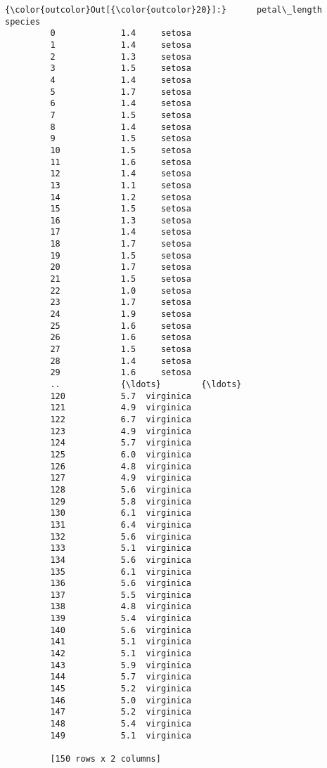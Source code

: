 \documentclass[11pt]{article}
\begin{document}
\begin{Verbatim}[commandchars=\\\{\}]
{\color{outcolor}Out[{\color{outcolor}20}]:}      petal\_length    species
         0             1.4     setosa
         1             1.4     setosa
         2             1.3     setosa
         3             1.5     setosa
         4             1.4     setosa
         5             1.7     setosa
         6             1.4     setosa
         7             1.5     setosa
         8             1.4     setosa
         9             1.5     setosa
         10            1.5     setosa
         11            1.6     setosa
         12            1.4     setosa
         13            1.1     setosa
         14            1.2     setosa
         15            1.5     setosa
         16            1.3     setosa
         17            1.4     setosa
         18            1.7     setosa
         19            1.5     setosa
         20            1.7     setosa
         21            1.5     setosa
         22            1.0     setosa
         23            1.7     setosa
         24            1.9     setosa
         25            1.6     setosa
         26            1.6     setosa
         27            1.5     setosa
         28            1.4     setosa
         29            1.6     setosa
         ..            {\ldots}        {\ldots}
         120           5.7  virginica
         121           4.9  virginica
         122           6.7  virginica
         123           4.9  virginica
         124           5.7  virginica
         125           6.0  virginica
         126           4.8  virginica
         127           4.9  virginica
         128           5.6  virginica
         129           5.8  virginica
         130           6.1  virginica
         131           6.4  virginica
         132           5.6  virginica
         133           5.1  virginica
         134           5.6  virginica
         135           6.1  virginica
         136           5.6  virginica
         137           5.5  virginica
         138           4.8  virginica
         139           5.4  virginica
         140           5.6  virginica
         141           5.1  virginica
         142           5.1  virginica
         143           5.9  virginica
         144           5.7  virginica
         145           5.2  virginica
         146           5.0  virginica
         147           5.2  virginica
         148           5.4  virginica
         149           5.1  virginica
         
         [150 rows x 2 columns]
\end{Verbatim}
            
\end{document}
